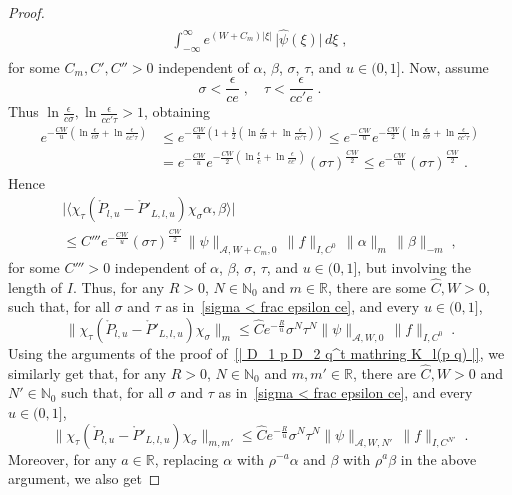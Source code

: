 \documentclass{memo-l}
\theoremstyle{plain}
\theoremstyle{definition}
\theoremstyle{remark}
\newcommand{\N}{\mathbb{N}}
\newcommand{\R}{\mathbb{R}}
\renewcommand{\AA}{\mathcal{A}}
\numberwithin{section}{chapter}
\numberwithin{equation}{section}%
\begin{document}
\begin{proof}
\begin{multline*}
\begin{aligned}
\int_{-\infty}^{\infty}e^{(W+C_m)|\xi|}\,\big|\hat\psi(\xi)\big|\,d\xi\;,
\end{aligned}
\end{multline*}
for some $C_m,C',C''>0$ independent of $\alpha$, $\beta$, $\sigma$, $\tau$, and $u\in(0,1]$. Now, assume 
\begin{equation}\label{sigma < frac epsilon ce}
\sigma<\frac{\epsilon}{ce}\;,\quad\tau<\frac{\epsilon}{cc'e}\;.
\end{equation}
Thus $\ln\frac{\epsilon}{c \sigma},\ln\frac{\epsilon}{cc'\tau}>1$, obtaining 
\begin{align*}
e^{-\frac{CW}{u}(\ln \frac{\epsilon}{c \sigma}+\ln\frac{\epsilon}{cc'\tau})}
&\le e^{-\frac{CW}{u}(1+\frac{1}{2}(\ln \frac{\epsilon}{c \sigma}+\ln\frac{\epsilon}{cc'\tau}))}
\le e^{-\frac{CW}{u}}e^{-\frac{CW}{2}(\ln \frac{\epsilon}{c \sigma}+\ln\frac{\epsilon}{cc'\tau})}\\
&=e^{-\frac{CW}{u}}e^{-\frac{CW}{2}(\ln \frac{\epsilon}{c}+\ln\frac{\epsilon}{cc'})}(\sigma\tau)^{\frac{CW}{2}}
\le e^{-\frac{CW}{u}}(\sigma\tau)^{\frac{CW}{2}}\;.
\end{align*}
Hence
\begin{multline*}
\big|\big\langle\chi_\tau(\mathring P_{l,u}-\mathring P'_{L,l,u})\chi_\sigma\alpha,\beta\big\rangle\big|\\
\le C'''e^{-\frac{CW}{u}}(\sigma\tau)^{\frac{CW}{2}}\,\|\psi\|_{\AA,W+C_m,0}\,\|f\|_{I,C^0}\, \|\alpha \|_m\,\|\beta \|_{-m}\;,
\end{multline*}
for some $C'''>0$ independent of $\alpha$, $\beta$, $\sigma$, $\tau$, and $u\in(0,1]$, but involving the length of $I$. Thus, for any $R>0$, $N\in\N_0$ and $m\in \R$, there are some $\widehat C,W>0$, such that, for all $\sigma$ and $\tau$ as in~\eqref{sigma < frac epsilon ce}, and every $u\in(0,1]$,
\[
\big\|\chi_\tau(\mathring P_{l,u}-\mathring P'_{L,l,u})\chi_\sigma\big\|_m
\le\widehat Ce^{-\frac{R}{u}}\sigma^N \tau^N \|\psi\|_{\AA,W,0}\,\|f\|_{I,C^0}\;.
\]
Using the arguments of the proof of~\eqref{| D_1 p D_2 q^t mathring K_l(p q) |}, we similarly get that, for any $R>0$, $N\in\N_0$ and $m,m'\in \R$, there are $\widehat C,W>0$ and $N'\in\N_0$ such that, for all $\sigma$ and $\tau$ as in~\eqref{sigma < frac epsilon ce}, and every $u\in(0,1]$,
\[
\big\|\chi_\tau(\mathring P_{l,u}-\mathring P'_{L,l,u})\chi_\sigma\big\|_{m,m'}
\le\widehat Ce^{-\frac{R}{u}}\sigma^N \tau^N\|\psi\|_{\AA,W,N'}\,\|f\|_{I,C^{N'}}\;.
\]
Moreover, for any $a\in\R$, replacing $\alpha$ with $\rho^{-a}\alpha$ and $\beta$ with $\rho^{a}\beta$ in the above argument, we also get

\end{proof}
\end{document}
